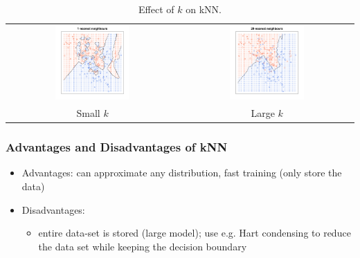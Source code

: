 \begin{table}[H]
    \centering
    \begin{tabular}{c|c}
        \includegraphics[width=0.45\textwidth]{figures/knn_small_k.png} & \includegraphics[width=0.45\textwidth]{figures/knn_large_k.png} \\
        Small $k$ & Large $k$
    \end{tabular}
    \caption{Effect of $k$ on kNN.}
    \label{tab:knn_k}
\end{table}


\subsubsection{Advantages and Disadvantages of kNN}
\begin{itemize}
    \item \textcolor{green1}{Advantages:} can approximate any distribution, fast training (only store the data)
    \item \textcolor{red1}{Disadvantages:}
    \begin{itemize}
        \item entire data-set is stored (large model); \textcolor{green1}{use e.g. Hart condensing to reduce the data set while keeping the decision boundary}
    \end{itemize}
\end{itemize}

